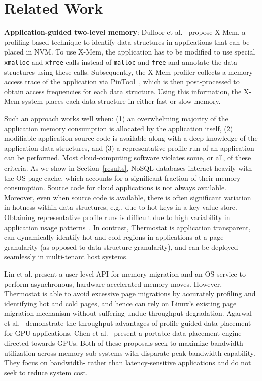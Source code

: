 \section{Related Work}
\label{related}

\textbf{Application-guided two-level memory}: Dulloor et al.~\cite{ref:Dulloor:datatiering} propose X-Mem, a profiling based
technique to identify data structures in applications that can be placed in
NVM. To use X-Mem, the application has to be modified to use special {\tt
xmalloc} and {\tt xfree} calls instead of {\tt malloc} and {\tt free} and
annotate the data structures using these calls. Subsequently, the X-Mem profiler
collects a memory access trace of the application via PinTool~\cite{ref:pin},
which is then post-processed to obtain access frequencies for each data
structure. Using this information, the X-Mem system places each data structure
in either fast or slow memory.

Such an approach works well when: (1) an overwhelming majority of the application
memory consumption is allocated by the application itself, (2) modifiable
application source code is available along with a deep knowledge of the
application data structures, and (3) a representative profile run of an
application can be performed.
Most cloud-computing software violates some, or all, of these criteria. As we
show in Section~\ref{results}, NoSQL databases interact heavily with the OS page cache, 
which accounts for a significant fraction of their memory consumption. Source code for cloud
applications is not always available.
Moreover, even when source code is available, there is
often significant variation in hotness within data structures, e.g., due to hot
keys in a key-value store.
Obtaining representative profile runs is difficult due to high variability in
application usage patterns~\cite{facebook-key-value}. 
In contrast, Thermostat is application transparent, can dynamically 
identify hot and cold regions in applications at a page granularity (as opposed 
to data structure granularity),
and can be deployed seamlessly in multi-tenant host systems.

Lin et al. present a user-level API for memory migration and an OS service to perform
asynchronous, hardware-accelerated memory moves\cite{ref:memif:Lin:2016}.
However, Thermostat is able to avoid excessive page migrations by
accurately profiling and identifying hot and cold pages, and hence can rely on 
Linux's existing page migration mechanism without suffering undue throughput
degradation.  Agarwal et
al.~\cite{ref:agarwal:asplos2015, ref:agarwal:hpca2015} demonstrate the throughput advantages of profile
guided data placement for GPU applications. Chen et al.~\cite{ref:chen:porple}
present a portable data placement engine directed towards GPUs. Both of these
proposals seek to maximize bandwidth utilization across memory sub-systems
with disparate peak bandwidth capability.  They focus on bandwidth- rather than
latency-sensitive applications and do not seek to reduce system cost.

